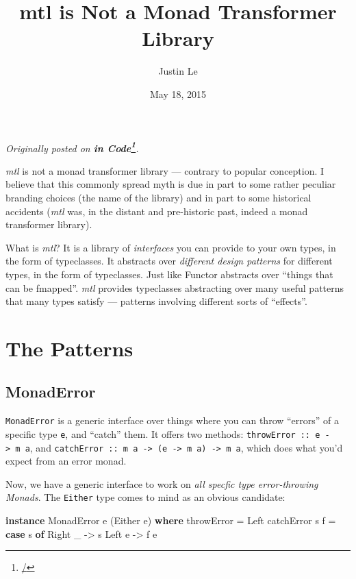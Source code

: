 \documentclass[]{article}
\title{mtl is Not a Monad Transformer Library}
\author{Justin Le}
\date{May 18, 2015}
\newenvironment{Shaded}{}{}
\newcommand{\KeywordTok}[1]{\textcolor[rgb]{0.00,0.44,0.13}{\textbf{{#1}}}}
\newcommand{\DataTypeTok}[1]{\textcolor[rgb]{0.56,0.13,0.00}{{#1}}}
\newcommand{\OtherTok}[1]{\textcolor[rgb]{0.00,0.44,0.13}{{#1}}}
\newcommand{\FunctionTok}[1]{\textcolor[rgb]{0.02,0.16,0.49}{{#1}}}
\newcommand{\NormalTok}[1]{{#1}}
\renewcommand{\href}[2]{#2\footnote{\url{#1}}}
\begin{document}
\maketitle

\emph{Originally posted on \textbf{\href{/}{in Code}}.}

\emph{mtl} is not a monad transformer library --- contrary to popular
conception. I believe that this commonly spread myth is due in part to
some rather peculiar branding choices (the name of the library) and in
part to some historical accidents (\emph{mtl} was, in the distant and
pre-historic past, indeed a monad transformer library).

What is \emph{mtl}? It is a library of \emph{interfaces} you can provide
to your own types, in the form of typeclasses. It abstracts over
\emph{different design patterns} for different types, in the form of
typeclasses. Just like Functor abstracts over ``things that can be
fmapped''. \emph{mtl} provides typeclasses abstracting over many useful
patterns that many types satisfy --- patterns involving different sorts
of ``effects''.

\section{The Patterns}\label{the-patterns}

\subsection{MonadError}\label{monaderror}

\texttt{MonadError} is a generic interface over things where you can
throw ``errors'' of a specific type \texttt{e}, and ``catch'' them. It
offers two methods: \texttt{throwError\ ::\ e\ -\textgreater{}\ m\ a},
and
\texttt{catchError\ ::\ m\ a\ -\textgreater{}\ (e\ -\textgreater{}\ m\ a)\ -\textgreater{}\ m\ a},
which does what you'd expect from an error monad.

Now, we have a generic interface to work on \emph{all specfic type
error-throwing Monads}. The \texttt{Either} type comes to mind as an
obvious candidate:

\begin{Shaded}
\begin{Highlighting}[]
\KeywordTok{instance} \DataTypeTok{MonadError} \NormalTok{e (}\DataTypeTok{Either} \NormalTok{e) }\KeywordTok{where}
    \NormalTok{throwError }\FunctionTok{=} \DataTypeTok{Left}
    \NormalTok{catchError s f }\FunctionTok{=} \KeywordTok{case} \NormalTok{s }\KeywordTok{of}
                       \DataTypeTok{Right} \NormalTok{_ }\OtherTok{->} \NormalTok{s}
                       \DataTypeTok{Left} \NormalTok{e  }\OtherTok{->} \NormalTok{f e}
\end{Highlighting}
\end{Shaded}
\end{document}

